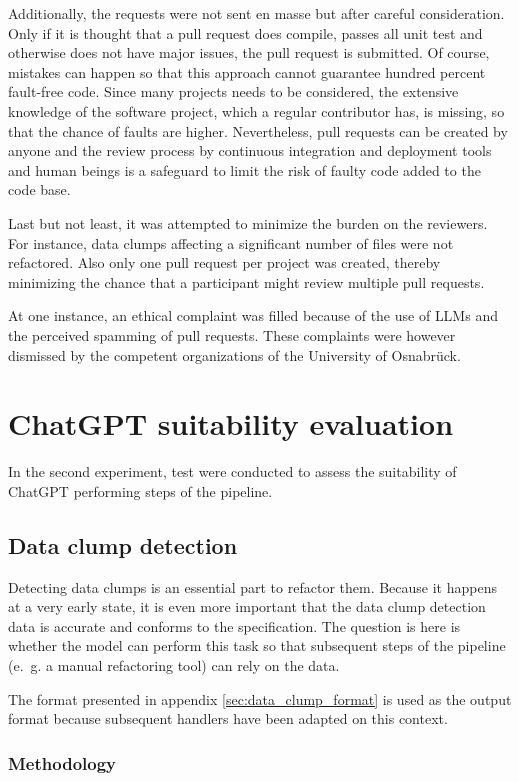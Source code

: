 Additionally, the requests were not sent en masse but after careful consideration. Only if it is thought that a pull request does compile, passes all unit test and otherwise does not have major issues, the pull request is submitted. Of course, mistakes can happen so that this approach cannot guarantee hundred percent fault-free code. Since many projects needs to be considered, the extensive knowledge of the software project, which a regular contributor has, is missing, so that the chance of faults are higher. Nevertheless, pull requests can be created by anyone and the review process by continuous integration and deployment tools and human beings is a safeguard to limit the risk of faulty code added to the code base. 

Last but not least, it was attempted to minimize the burden on the reviewers. For instance, data clumps affecting a significant number of files were not refactored. Also only one pull request per project was created, thereby minimizing the chance that a participant might review multiple pull requests. 

At one instance, an ethical complaint was filled because of the use of \acfp{LLM} and the perceived spamming of pull requests. These complaints were however dismissed by the competent organizations of the University of Osnabrück.  

\section{ChatGPT suitability evaluation}

In the second experiment, test were conducted to assess the suitability of ChatGPT performing steps of the pipeline.
\subsection{Data clump detection}

Detecting data clumps is an essential part to refactor them. Because it happens at a very early state, it is even more important that the data clump detection data is accurate and conforms to the specification. The question is here is whether the model can perform this task so that subsequent steps of the pipeline (e.~g. a manual refactoring tool) can rely on the data.

The format presented in appendix \ref{sec:data_clump_format} is used as the output format because subsequent handlers have been adapted on this context. 


\subsubsection{Methodology}

